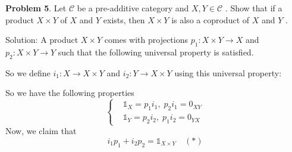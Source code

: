 \begin{dang}
\textbf{Problem 5}. Let $\mathcal{C}$ be a pre-additive category and $X,Y\in \mathcal{C}$ . 
Show that if a product $X\times Y$ of $X$ and $Y$ exists, then $X\times Y$ is also a coproduct of $X$ and $Y$ .   
\end{dang}
Solution: A product $X\times Y$ comes with projections $p_1:X\times Y\to X$ and $p_2:X\times Y\to Y$ such that the following universal
property is satisfied. 
\begin{center}
\end{center}
So we define $i_1:X\to X\times Y$ and $i_2:Y\to X\times Y$ using this universal property:
\begin{center}

\end{center}
So we have the following properties 
\begin{equation}\label{equation: relations between projections and injections}
    \left\{\begin{aligned}
        &\mathds{1}_X=p_1i_1,\; p_2i_1 = 0_{XY}\\
        &\mathds{1}_Y = p_2i_2,\;p_1i_2 = 0_{YX}
    \end{aligned}\right.
\end{equation}
Now, we claim that 
\begin{equation}
    i_1p_1+i_2p_2 = \mathds{1}_{X\times Y}\quad(*)
\end{equation}
